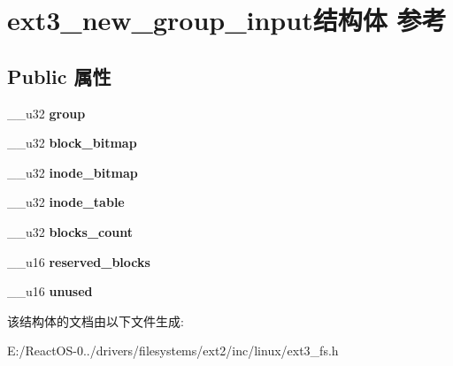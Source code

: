 \hypertarget{structext3__new__group__input}{}\section{ext3\+\_\+new\+\_\+group\+\_\+input结构体 参考}
\label{structext3__new__group__input}
\subsection*{Public 属性}
\begin{DoxyCompactItemize}
\item 
\mbox{\label{structext3__new__group__input_abba871de6fd02fac0ff9656c0fba3adf}} 
\+\_\+\+\_\+u32 {\bfseries group}
\item 
\mbox{\label{structext3__new__group__input_ab895ed8c5685cf6b55a64eb537e0dcc6}} 
\+\_\+\+\_\+u32 {\bfseries block\+\_\+bitmap}
\item 
\mbox{\label{structext3__new__group__input_a543a22693b8893017a71ff47803e3043}} 
\+\_\+\+\_\+u32 {\bfseries inode\+\_\+bitmap}
\item 
\mbox{\label{structext3__new__group__input_a274613f16d00151a5cf431b4e631ea14}} 
\+\_\+\+\_\+u32 {\bfseries inode\+\_\+table}
\item 
\mbox{\label{structext3__new__group__input_a66c3dc870650a7d712855fbbad00ccae}} 
\+\_\+\+\_\+u32 {\bfseries blocks\+\_\+count}
\item 
\mbox{\label{structext3__new__group__input_a9cc8e43497af89aa3e7217f16ef38293}} 
\+\_\+\+\_\+u16 {\bfseries reserved\+\_\+blocks}
\item 
\mbox{\label{structext3__new__group__input_a4fe4cda2bec6b7193551322aba35bee1}} 
\+\_\+\+\_\+u16 {\bfseries unused}
\end{DoxyCompactItemize}


该结构体的文档由以下文件生成\+:\begin{DoxyCompactItemize}
\item 
E\+:/\+React\+O\+S-\/0../drivers/filesystems/ext2/inc/linux/ext3\+\_\+fs.\+h\end{DoxyCompactItemize}

